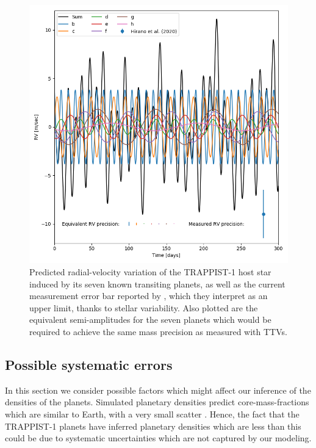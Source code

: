 \documentclass[fleqn,usenatbib]{mnras} %
\begin{document}
\begin{figure}
    \centering
    \includegraphics[width=\hsize]{figures/Equivalent_RV_precision.png}
    \caption{Predicted radial-velocity variation of the TRAPPIST-1 host star
    induced by its seven known transiting planets, as well as the current
    measurement error bar reported by \citet{Hirano2020}, which they interpret
    as an upper limit, thanks to stellar variability.  Also plotted are
    the equivalent semi-amplitudes for the seven planets which would be required
    to achieve the same mass precision as measured with TTVs.}
    \label{fig:rv_forecast}
\end{figure}

\subsection{Possible systematic errors}

In this section we consider possible factors which might affect our
inference of the densities of the planets.  Simulated planetary
densities predict core-mass-fractions which are similar to 
Earth, with a very small scatter \citep{Scora2020}.  Hence, the
fact that the TRAPPIST-1 planets have inferred planetary densities
which are less than this could be due to systematic uncertainties
which are not captured by our modeling.
\end{document}
